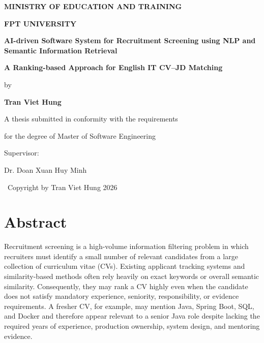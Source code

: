 \documentclass[12pt,a4paper,oneside]{report}
\newcommand{\thesistitle}{AI-driven Software System for Recruitment Screening using NLP and Semantic Information Retrieval}
\newcommand{\thesissubtitle}{A Ranking-based Approach for English IT CV--JD Matching}
\begin{document}
\begin{titlepage}
\thispagestyle{empty}
\centering
\vspace*{0.5cm}
{\bfseries\large MINISTRY OF EDUCATION AND TRAINING\par}
\vspace{0.35cm}
{\bfseries\large FPT UNIVERSITY\par}

\vspace{2.65cm}
{\bfseries\LARGE \thesistitle\par}
\vspace{0.55cm}
{\bfseries\Large \thesissubtitle\par}

\vspace{1.15cm}
{\large by\par}
\vspace{0.4cm}
{\bfseries\large Tran Viet Hung\par}

\vspace{1.05cm}
{\large A thesis submitted in conformity with the requirements\par}
\vspace{0.3cm}
{\large for the degree of Master of Software Engineering\par}

\vspace{1.0cm}
{\large Supervisor:\par}
\vspace{0.35cm}
{\large Dr. Doan Xuan Huy Minh\par}

\vfill
{\large \textcopyright\ Copyright by Tran Viet Hung 2026\par}
\end{titlepage}

\hypersetup{pageanchor=true}
\setcounter{page}{1}

\chapter*{Abstract}
Recruitment screening is a high-volume information filtering problem in which recruiters must identify a small number of relevant candidates from a large collection of curriculum vitae (CVs). Existing applicant tracking systems and similarity-based methods often rely heavily on exact keywords or overall semantic similarity. Consequently, they may rank a CV highly even when the candidate does not satisfy mandatory experience, seniority, responsibility, or evidence requirements. A fresher CV, for example, may mention Java, Spring Boot, SQL, and Docker and therefore appear relevant to a senior Java role despite lacking the required years of experience, production ownership, system design, and mentoring evidence.
\end{document}
